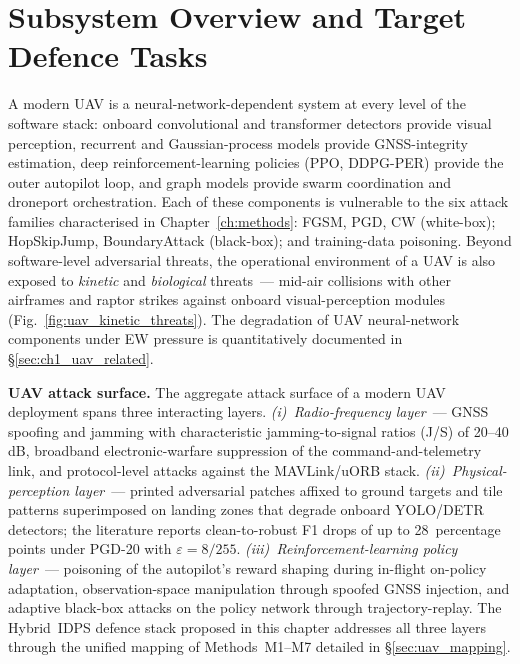 \section{Subsystem Overview and Target Defence Tasks}
\label{sec:uav_overview}

A modern UAV is a neural-network-dependent system at every level of
the software stack: onboard convolutional and transformer detectors
provide visual perception, recurrent and Gaussian-process models
provide GNSS-integrity estimation, deep reinforcement-learning
policies (PPO, DDPG-PER) provide the outer autopilot loop, and graph
models provide swarm coordination and droneport orchestration. Each
of these components is vulnerable to the six attack families
characterised in Chapter~\ref{ch:methods}: FGSM, PGD, CW (white-box);
HopSkipJump, BoundaryAttack (black-box); and training-data poisoning.
Beyond software-level adversarial threats, the operational environment
of a UAV is also exposed to \emph{kinetic} and \emph{biological}
threats~--- mid-air collisions with other airframes and raptor strikes
against onboard visual-perception modules
(Fig.~\ref{fig:uav_kinetic_threats}). The degradation of UAV
neural-network components under EW pressure is quantitatively
documented in \S\ref{sec:ch1_uav_related}.

\noindent\textbf{UAV attack surface.} The aggregate attack surface
of a modern UAV deployment spans three interacting layers.
\emph{(i)~Radio-frequency layer}~--- GNSS spoofing and jamming with
characteristic jamming-to-signal ratios (J/S) of 20--40\,dB,
broadband electronic-warfare suppression of the
command-and-telemetry link, and protocol-level attacks against the
MAVLink/uORB stack. \emph{(ii)~Physical-perception layer}~---
printed adversarial patches affixed to ground targets and tile
patterns superimposed on landing zones that degrade onboard
YOLO/DETR detectors; the literature reports clean-to-robust F1
drops of up to 28~percentage points under PGD-20 with
$\varepsilon{=}8/255$. \emph{(iii)~Reinforcement-learning policy
layer}~--- poisoning of the autopilot's reward shaping during
in-flight on-policy adaptation, observation-space manipulation
through spoofed GNSS injection, and adaptive black-box attacks on
the policy network through trajectory-replay. The Hybrid~IDPS
defence stack proposed in this chapter addresses all three layers
through the unified mapping of Methods~M1--M7 detailed in
\S\ref{sec:uav_mapping}.

